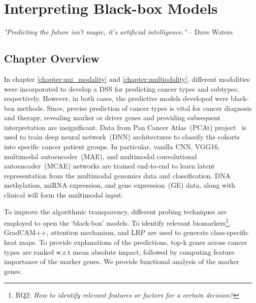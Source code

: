 \chapter{Interpreting Black-box Models}\label{chapter:xai}

\textit{"Predicting the future isn't magic, it's artificial intelligence."} -- Dave Waters 

\section{Chapter Overview}
In chapter \ref{chapter:uni_modality} and \ref{chapter:multiodality}, different modalities were incorporated to develop a DSS for predicting cancer types and subtypes, respectively. However, in both cases, the predictive models developed were black-box methods. Since, precise prediction of cancer types is vital for cancer diagnosis and therapy, revealing marker or driver genes and providing subsequent interpretation are insignificant. Data from Pan Cancer Atlas~(PCAt) project~\cite{weinstein2013cancer} is used to train deep neural network~(DNN) architectures to classify the cohorts into specific cancer patient groups. In particular, vanilla CNN, VGG16, multimodal autoencoder~(MAE), and multimodal convolutional autoencoder~(MCAE) networks are trained end-to-end to learn latent representation from the multimodal genomics data and classification. DNA methylation, miRNA expression, and gene expression~(GE) data, along with clinical will form the multimodal input. 

\hspace*{3.5mm} To improve the algorithmic transparency, different probing techniques are employed to open the `black-box' models. %
To identify relevant biomarkers\footnote{RQ2: \textit{How to identify relevant features or factors for a certain decision?}}, GradCAM++, attention mechanism, and LRP are used to generate class-specific heat maps. To provide explanations of the predictions, top-k genes across cancer types are ranked w.r.t mean absolute impact, followed by computing feature importance of the marker genes. We provide functional analysis of the marker genes.  

